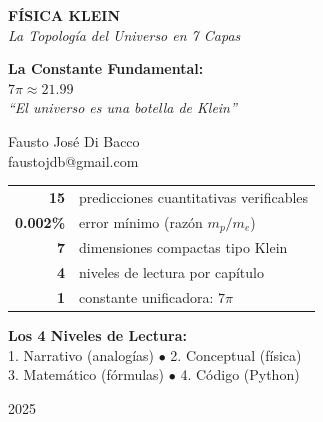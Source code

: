 \documentclass[12pt,a4paper,openany]{book}
\begin{document}
\begin{titlepage}
    \centering
    \vspace*{1cm}

    {\Huge\bfseries\color{kleinblue} FÍSICA KLEIN}\\[0.5cm]
    {\LARGE\itshape La Topología del Universo en 7 Capas}\\[1.5cm]

    \begin{tcolorbox}[
        colback=white,
        colframe=kleinblue,
        width=0.85\textwidth,
        arc=5mm,
        boxrule=2pt
    ]
    \centering
    \Large
    \textbf{La Constante Fundamental:}\\[0.3cm]
    {\Huge $\boxed{7\pi \approx 21.99}$}\\[0.5cm]
    \textit{``El universo es una botella de Klein''}
    \end{tcolorbox}

    \vspace{1.5cm}

    {\Large Fausto José Di Bacco}\\[0.3cm]
    {\large faustojdb@gmail.com}\\[1.5cm]

    \begin{tabular}{rl}
        \textbf{15} & predicciones cuantitativas verificables\\[0.2cm]
        \textbf{0.002\%} & error mínimo (razón $m_p/m_e$)\\[0.2cm]
        \textbf{7} & dimensiones compactas tipo Klein\\[0.2cm]
        \textbf{4} & niveles de lectura por capítulo\\[0.2cm]
        \textbf{1} & constante unificadora: $7\pi$
    \end{tabular}

    \vfill

    \begin{tcolorbox}[colback=kleingray, colframe=gray, width=0.7\textwidth]
    \centering\small
    \textbf{Los 4 Niveles de Lectura:}\\
    1. Narrativo (analogías) $\bullet$ 2. Conceptual (física)\\
    3. Matemático (fórmulas) $\bullet$ 4. Código (Python)
    \end{tcolorbox}

    \vspace{0.5cm}
    {\large 2025}
\end{titlepage}
\end{document}
